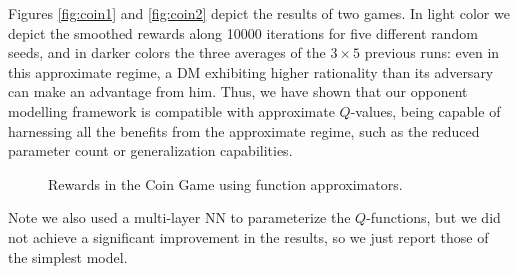 Figures \ref{fig:coin1} and \ref{fig:coin2} depict the results of two games. In light color we depict the smoothed rewards along 10000 iterations for five different random seeds, and in darker colors the three averages of the $3 \times 5$ previous runs:
even in this approximate regime, a DM exhibiting higher rationality than its adversary can make an advantage from him. Thus, we have shown that our opponent modelling framework is compatible with approximate $Q$-values, being capable of harnessing all the benefits from the approximate regime, such as the reduced parameter count or generalization capabilities.
\begin{figure}%
\centering
{}%
  \caption{Rewards in the Coin Game using function approximators. }
\end{figure}

Note we also used a multi-layer NN to parameterize the $Q$-functions, but we did not achieve a significant improvement in the results, so we just report those of the simplest model.


